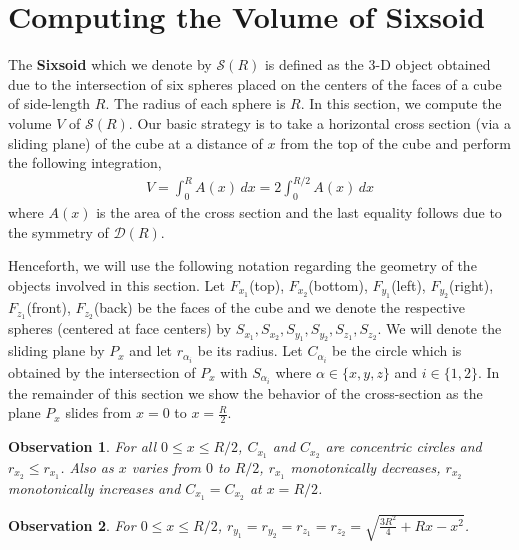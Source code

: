 \documentclass[conference]{IEEEtran}
\newtheorem{observation}{Observation}
\begin{document}
\section{Computing the Volume of Sixsoid}
The \textbf{Sixsoid} which we denote by $\mathcal{S}(R)$ is defined as the 3-D object obtained due to the intersection of
six spheres placed on the centers of the faces of a cube of side-length $R$. The radius of
each sphere is $R$. In this section, we compute the volume $V$ of $\mathcal{S}(R)$.
Our basic strategy is to take a horizontal cross section (via a sliding plane) of the cube at a distance of $x$ from the top of
the cube and perform the following integration,
\begin{eqnarray*}
V = \int^{R}_{0} A(x)\,dx = 2 \int^{R/2}_{0} A(x)\,dx
\end{eqnarray*}
where $A(x)$ is the area of the cross section and the last equality follows due to the 
symmetry of $\mathcal{D}(R)$.

Henceforth, we will use the following notation regarding the geometry of
the objects involved in this section. Let $F_{x_1}$(top), $F_{x_2}$(bottom), $F_{y_1}$(left), $F_{y_2}$(right),
$F_{z_1}$(front), $F_{z_2}$(back) be the faces of the cube and  we denote the respective spheres (centered at face centers) 
by $S_{x_1},S_{x_2}, S_{y_1},S_{y_2}, S_{z_1},S_{z_2}$. We will denote the sliding plane by $P_{x}$ and let $r_{\alpha_i}$ be its radius. Let $C_{\alpha_i}$ be the circle which is obtained by the intersection of $P_x$ with $S_{\alpha_i}$ where $\alpha\in \{x,y,z\}$ and $i \in \{1,2\}$. In the remainder of this section we show the behavior of the cross-section as the plane $P_x$ slides from $x = 0$ to $x = \frac{R}{2}$.

\begin{observation}
 For all $0 \leq x \leq R/2$, $C_{x_1}$ and $C_{x_2}$ are concentric circles and $r_{x_2} \leq r_{x_1}$.
Also as $x$ varies from $0$ to $R/2$, $r_{x_1}$ monotonically decreases, $r_{x_2}$ monotonically increases and $C_{x_1} = C_{x_2}$ at
$x = R/2$.
\end{observation}

\begin{observation}
For $0 \leq x \leq R/2$, $r_{y_1} = r_{y_2} = r_{z_1} = r_{z_2} = \sqrt{\frac{3R^2}{4} + Rx - x^2}$.
\end{observation}
\end{document}
